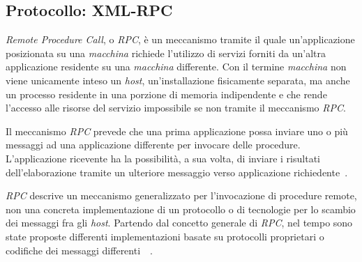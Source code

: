 
\subsection{Protocollo: XML-RPC}

\emph{Remote Procedure Call}, o \emph{RPC}, è un meccanismo tramite il quale un'applicazione posizionata su una \emph{macchina} richiede l'utilizzo di servizi forniti da un'altra applicazione residente su una \emph{macchina} differente. Con il termine \emph{macchina} non viene unicamente inteso un \emph{host}, un'installazione fisicamente separata, ma anche un processo residente in una porzione di memoria indipendente e che rende l'accesso alle risorse del servizio impossibile se non tramite il meccanismo \emph{RPC}. 

Il meccanismo \emph{RPC} prevede che una prima applicazione possa inviare uno o più messaggi ad una applicazione differente per invocare delle procedure. L'applicazione ricevente ha la possibilità,  a sua volta, di inviare i risultati dell'elaborazione tramite un ulteriore messaggio verso applicazione richiedente~\cite{MERRICK:2006:misc}.

\emph{RPC} descrive un meccanismo generalizzato per l'invocazione di procedure remote, non una concreta implementazione di un protocollo o di tecnologie per lo scambio dei messaggi fra gli \emph{host}. Partendo dal concetto generale di \emph{RPC}, nel tempo sono state proposte differenti implementazioni basate su protocolli proprietari o codifiche dei messaggi differenti~\cite{JAIRATH:2004:misc}~\cite{dcerpc}.


